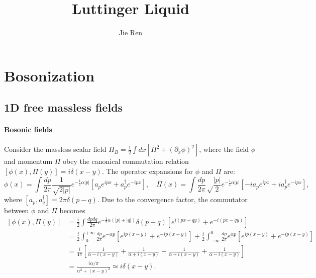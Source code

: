 \documentclass[aps,prb,superscriptaddress,nofootinbib]{revtex4}
\begin{document}
\title{Luttinger Liquid}
\author{Jie Ren}


\maketitle


\tableofcontents

\section{Bosonization}

\subsection{1D free massless fields}
\paragraph*{Bosonic fields}
Consider the massless scalar field $H_B = \frac{1}{2}\int dx[\Pi^2+(\partial_x\phi)^2]$, where the field $\phi$ and momentum $\Pi$ obey the canonical commutation relation $[\phi(x),\Pi(y)] = i\delta(x-y)$.
The operator expansions for $\phi$ and $\Pi$ are:
\begin{equation*}
	\phi(x) = \int \frac{dp}{2\pi} \frac{1}{\sqrt{2|p|}} e^{-\frac{1}{2}\alpha|p|} \left[a_p e^{ipx} + a_p^\dagger e^{-ipx} \right], \quad
	\Pi(x) = \int \frac{dp}{2\pi} \sqrt\frac{|p|}{2} e^{-\frac{1}{2}\alpha|p|} \left[-ia_p e^{ipx} + ia_p^\dagger e^{-ipx} \right],
\end{equation*}
where $[a_p,a_q^\dagger]=2\pi\delta(p-q)$.
Due to the convergence factor, the commutator between $\phi$ and $\Pi$ becomes
\begin{equation*}
\begin{aligned}
	\left[\phi(x),\Pi(y)\right]
	&= \frac{i}{2} \int \frac{dp dq}{2\pi} e^{-\frac{1}{2}\alpha(|p|+|q|)} \delta(p-q)\left[e^{i(px-qy)}+e^{-i(px-qy)}\right] \\
	&= \frac{i}{2} \int_0^{+\infty} \frac{dp}{2\pi} e^{-\alpha p} \left[e^{ip(x-y)}+e^{-ip(x-y)}\right] + \frac{i}{2} \int^0_{-\infty} \frac{dp}{2\pi} e^{\alpha p} \left[e^{ip(x-y)}+e^{-ip(x-y)}\right] \\
	&= \frac{i}{4\pi} \left[\frac{1}{\alpha - i(x-y)}+\frac{1}{\alpha + i(x-y)}+\frac{1}{\alpha+i(x-y)}+\frac{1}{\alpha-i(x-y)}\right] \\
	&= \frac{i\alpha/\pi}{\alpha^2 + (x-y)^2} \simeq i\delta(x-y).
\end{aligned}
\end{equation*}
\end{document}
